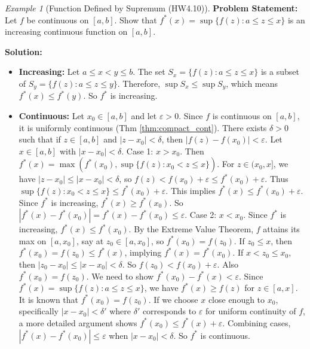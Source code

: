 \documentclass{article}
\theoremstyle{definition}
\theoremstyle{plain}
\theoremstyle{remark}
\newtheorem{example}{Example}[section]
\newcommand{\eps}{\varepsilon}
\begin{document}
\begin{example}[Function Defined by Supremum (HW4.10)]
\textbf{Problem Statement:} Let \(f\) be continuous on \([a,b]\). Show that \(f^*(x) = \sup \{ f(z) : a \le z \le x \}\) is an increasing continuous function on \([a,b]\).

\textbf{Solution:}
\begin{itemize}
    \item \textbf{Increasing:} Let \(a \le x < y \le b\). The set \(S_x = \{ f(z) : a \le z \le x \}\) is a subset of \(S_y = \{ f(z) : a \le z \le y \}\). Therefore, \(\sup S_x \le \sup S_y\), which means \(f^*(x) \le f^*(y)\). So \(f^*\) is increasing.
    \item \textbf{Continuous:} Let \(x_0 \in [a, b]\) and let \(\eps > 0\). Since \(f\) is continuous on \([a, b]\), it is uniformly continuous (Thm \ref{thm:compact_cont}). There exists \(\delta > 0\) such that if \(z \in [a, b]\) and \(|z-x_0| < \delta\), then \(|f(z) - f(x_0)| < \eps\).
        Let \(x \in [a, b]\) with \(|x-x_0| < \delta\).
        Case 1: \(x > x_0\). Then \(f^*(x) = \max(f^*(x_0), \sup\{f(z) : x_0 < z \le x\})\). For \(z \in (x_0, x]\), we have \(|z-x_0| \le |x-x_0| < \delta\), so \(f(z) < f(x_0) + \eps \le f^*(x_0) + \eps\). Thus \(\sup\{f(z) : x_0 < z \le x\} \le f^*(x_0) + \eps\). This implies \(f^*(x) \le f^*(x_0) + \eps\). Since \(f^*\) is increasing, \(f^*(x) \ge f^*(x_0)\). So \(|f^*(x) - f^*(x_0)| = f^*(x) - f^*(x_0) \le \eps\).
        Case 2: \(x < x_0\). Since \(f^*\) is increasing, \(f^*(x) \le f^*(x_0)\). By the Extreme Value Theorem, \(f\) attains its max on \([a, x_0]\), say at \(z_0 \in [a, x_0]\), so \(f^*(x_0) = f(z_0)\). If \(z_0 \le x\), then \(f^*(x_0) = f(z_0) \le f^*(x)\), implying \(f^*(x)=f^*(x_0)\). If \(x < z_0 \le x_0\), then \(|z_0 - x_0| \le |x-x_0| < \delta\). So \(f(z_0) < f(x_0) + \eps\). Also \(f^*(x_0)=f(z_0)\). We need to show \(f^*(x_0) - f^*(x) < \eps\). Since \(f^*(x) = \sup\{f(z): a \le z \le x\}\), we have \(f^*(x) \ge f(z)\) for \(z \in [a, x]\). It is known that \(f^*(x_0) = f(z_0)\). If we choose \(x\) close enough to \(x_0\), specifically \(|x-x_0| < \delta'\) where \(\delta'\) corresponds to \(\eps\) for uniform continuity of \(f\), a more detailed argument shows \(f^*(x_0) \le f^*(x) + \eps\).
        Combining cases, \(|f^*(x) - f^*(x_0)| \le \eps\) when \(|x-x_0| < \delta\). So \(f^*\) is continuous.
\end{itemize}
\end{example}
\end{document}
